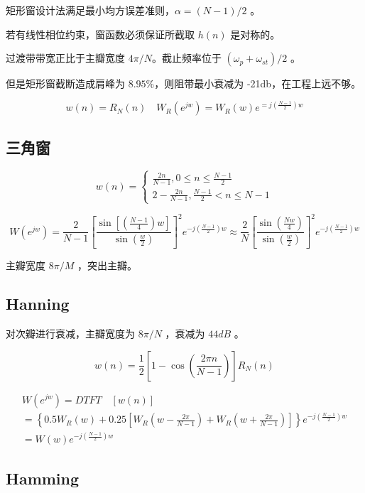 \documentclass[cn,11pt,chinese,black,simple]{elegantbook}
\begin{document}
矩形窗设计法满足最小均方误差准则，\(\alpha = (N - 1) / 2\) 。

若有线性相位约束，窗函数必须保证所截取 \(h(n)\) 是对称的。

过渡带带宽正比于主瓣宽度 \(4 \pi / N\)。截止频率位于 \((\omega_p + \omega_{st}) / 2\) 。

但是矩形窗截断造成肩峰为 \(8.95 \%\)，则阻带最小衰减为 -21db，在工程上远不够。

\[
w(n)=R_{N}(n) \quad W_{R}\left(e^{j w}\right)=W_{R}(w) e^{=j\left(\frac{N-1}{2}\right) w}
\]

\subsection{三角窗}

\[
w(n)=\left\{\begin{array}{l}
\frac{2 n}{N-1}, 0 \leq n \leq \frac{N-1}{2} \\
2-\frac{2 n}{N-1}, \frac{N-1}{2}<n \leq N-1
\end{array}\right.
\]

\[
W\left(e^{j w}\right)=\frac{2}{N-1}\left[\frac{\sin \left[\left(\frac{N-1}{4}\right) w\right]}{\sin \left(\frac{w}{2}\right)}\right]^{2} e^{-j\left(\frac{N-1}{2}\right) w} \approx \frac{2}{N}\left[\frac{\sin \left(\frac{N w}{4}\right)}{\sin \left(\frac{w}{2}\right)}\right]^{2} e^{-j\left(\frac{N-1}{2}\right) w}
\]


主瓣宽度 \(8 \pi / M\) ，突出主瓣。

\subsection{Hanning}

对次瓣进行衰减，主瓣宽度为 \(8 \pi / N\) ，衰减为 \(44 dB\) 。

\[
w(n)=\frac{1}{2}\left[1-\cos \left(\frac{2 \pi n}{N-1}\right)\right] R_{N}(n)
\]

\[
\begin{array}{l}
W\left(e^{j w}\right)=D T F T \quad[w(n)] \\
=\left\{0.5 W_{R}(w)+0.25\left[W_{R}\left(w-\frac{2 \pi}{N-1}\right)+W_{R}\left(w+\frac{2 \pi}{N-1}\right)\right]\right\} e^{-j\left(\frac{N-1}{2}\right) w} \\
=W(w) e^{-j\left(\frac{N-1}{2}\right) w}
\end{array}
\]

\subsection{Hamming}
\end{document}
